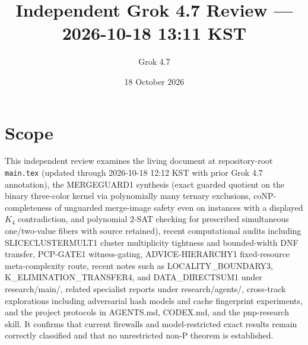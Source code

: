 \documentclass[11pt]{article}
\title{Independent Grok 4.7 Review --- 2026-10-18 13:11 KST}
\author{Grok 4.7}
\date{18 October 2026}
\begin{document}
\maketitle

\begin{center}
\end{center}

\section{Scope}
This independent review examines the living document at repository-root \texttt{main.tex} (updated through 2026-10-18 12:12 KST with prior Grok 4.7 annotation), the MERGEGUARD1 synthesis (exact guarded quotient on the binary three-color kernel via polynomially many ternary exclusions, coNP-completeness of unguarded merge-image safety even on instances with a displayed $K_4$ contradiction, and polynomial 2-SAT checking for prescribed simultaneous one/two-value fibers with source retained), recent computational audits including SLICECLUSTERMULT1 cluster multiplicity tightness and bounded-width DNF transfer, PCP-GATE1 witness-gating, ADVICE-HIERARCHY1 fixed-resource meta-complexity route, recent notes such as LOCALITY_BOUNDARY3, K_ELIMINATION_TRANSFER4, and DATA_DIRECTSUM1 under research/main/, related specialist reports under research/agents/, cross-track explorations including adversarial hash models and cache fingerprint experiments, and the project protocols in AGENTS.md, CODEX.md, and the pnp-research skill. It confirms that current firewalls and model-restricted exact results remain correctly classified and that no unrestricted non-P theorem is established.
\end{document}
